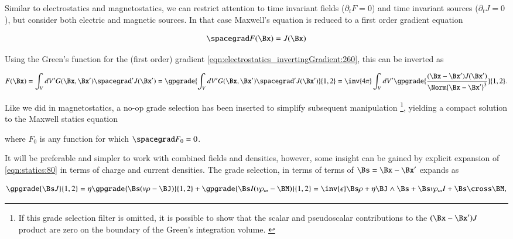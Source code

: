 %
%

Similar to electrostatics and magnetostatics, we can restrict attention to time invariant fields (\( \partial_t F = 0\)) and time invariant sources (\(\partial_t J = 0\)), but consider both electric and magnetic sources.  In that case Maxwell's equation is reduced to a first order gradient equation

\begin{dmath}\label{eqn:statics:20}
\spacegrad F(\Bx) = J(\Bx)
\end{dmath}

Using the Green's function for the (first order) gradient \cref{eqn:electrostatics_invertingGradient:260}, this can be inverted as

\begin{dmath}\label{eqn:statics:40}
F(\Bx)
= \int_V dV' G(\Bx, \Bx') \spacegrad' J(\Bx')
= \gpgrade{\int_V dV' G(\Bx, \Bx') \spacegrad' J(\Bx')}{1,2}
= \inv{4\pi} \int_V dV' \gpgrade{\frac{(\Bx - \Bx') J(\Bx')}{\Norm{\Bx - \Bx'}^3} }{1,2}.
\end{dmath}

Like we did in magnetostatics, a no-op grade selection has been inserted to simplify subsequent manipulation
\footnote{If this grade selection filter is omitted, it is possible to show that the scalar and pseudoscalar contributions to the \( (\Bx -\Bx') J \) product are zero on the boundary of the Green's integration volume. \citep{jancewicz1988multivectors:appendixI}},
yielding a compact solution to the Maxwell statics equation


where \( F_0 \) is any function for which \( \spacegrad F_0 = 0 \).

It will be preferable and simpler to work with combined fields and densities, however, some insight can be gained by
explicit expansion of \cref{eqn:statics:80} in terms of charge and current densities.
The grade selection, in terms of terms of \( \Bs = \Bx -\Bx' \) expands as

\begin{dmath}\label{eqn:statics:60}
\gpgrade{\Bs J}{1,2}
=
\eta \gpgrade{\Bs (v \rho - \BJ)}{1,2}
+
\gpgrade{\Bs I(v \rho_m - \BM)}{1,2}
=
\inv{\epsilon} \Bs \rho + \eta \BJ \wedge \Bs + \Bs v \rho_m I + \Bs \cross \BM,
\end{dmath}

